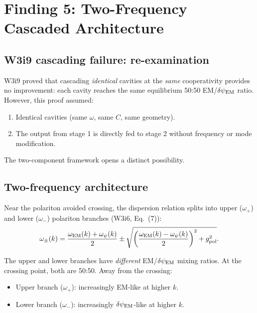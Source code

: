 \documentclass[11pt]{article}
\newcommand{\dpsiEM}{\delta\psi_{\rm EM}}
\begin{document}
\section{Finding 5: Two-Frequency Cascaded Architecture}
\label{sec:cascade-reexamine}

\subsection{W3i9 cascading failure: re-examination}

W3i9 proved that cascading \emph{identical} cavities at the \emph{same}
cooperativity provides no improvement: each cavity reaches the same
equilibrium 50:50 EM/$\dpsiEM$ ratio. However, this proof assumed:

\begin{enumerate}
\item Identical cavities (same $\omega$, same $C$, same geometry).
\item The output from stage 1 is directly fed to stage 2 without
  frequency or mode modification.
\end{enumerate}

The two-component framework opens a distinct possibility.

\subsection{Two-frequency architecture}

Near the polariton avoided crossing, the dispersion relation splits into
upper ($\omega_+$) and lower ($\omega_-$) polariton branches (W3i6,
Eq.~(7)):
\begin{equation}
\omega_\pm(k) = \frac{\omega_{\rm EM}(k) + \omega_\psi(k)}{2}
\pm \sqrt{\left(\frac{\omega_{\rm EM}(k) - \omega_\psi(k)}{2}\right)^2
+ g_{\rm pol}^2}.
\end{equation}

The upper and lower branches have \emph{different} EM/$\dpsiEM$ mixing
ratios. At the crossing point, both are 50:50. Away from the crossing:
\begin{itemize}[nosep]
\item Upper branch ($\omega_+$): increasingly EM-like at higher $k$.
\item Lower branch ($\omega_-$): increasingly $\dpsiEM$-like at higher $k$.
\end{itemize}
\end{document}
